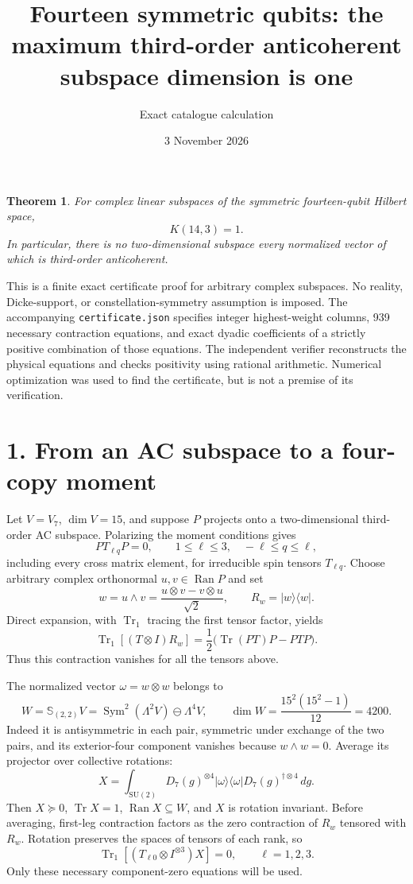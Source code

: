 \documentclass[11pt]{article}
\newtheorem{theorem}{Theorem}
\newcommand{\Tr}{\operatorname{Tr}}
\newcommand{\Sym}{\operatorname{Sym}}
\begin{document}
\title{Fourteen symmetric qubits: the maximum third-order anticoherent subspace dimension is one}
\author{Exact catalogue calculation}
\date{3 November 2026}
\maketitle
\begin{theorem}
For complex linear subspaces of the symmetric fourteen-qubit Hilbert space,
\[
 \boxed{K(14,3)=1.}
\]
In particular, there is no two-dimensional subspace every normalized vector of which is third-order anticoherent.
\end{theorem}
This is a finite exact certificate proof for arbitrary complex subspaces. No reality, Dicke-support, or constellation-symmetry assumption is imposed. The accompanying \texttt{certificate.json} specifies integer highest-weight columns, 939 necessary contraction equations, and exact dyadic coefficients of a strictly positive combination of those equations. The independent verifier reconstructs the physical equations and checks positivity using rational arithmetic. Numerical optimization was used to find the certificate, but is not a premise of its verification.

\section*{1. From an AC subspace to a four-copy moment}
Let $V=V_7$, $\dim V=15$, and suppose $P$ projects onto a two-dimensional third-order AC subspace. Polarizing the moment conditions gives
\[
 PT_{\ell q}P=0,\qquad 1\le\ell\le3,\quad -\ell\le q\le\ell,
\]
including every cross matrix element, for irreducible spin tensors $T_{\ell q}$.
Choose arbitrary complex orthonormal $u,v\in\operatorname{Ran}P$ and set
\[
 w=u\wedge v=\frac{u\otimes v-v\otimes u}{\sqrt2},
 \qquad R_w=|w\rangle\langle w|.
\]
Direct expansion, with $\Tr_1$ tracing the first tensor factor, yields
\[
 \Tr_1[(T\otimes I)R_w]
 =\frac12\bigl(\Tr(PT)P-PTP\bigr).
\]
Thus this contraction vanishes for all the tensors above.

The normalized vector $\omega=w\otimes w$ belongs to
\[
 W=\mathbb S_{(2,2)}V
 =\Sym^2(\Lambda^2V)\ominus\Lambda^4V,
 \qquad \dim W=\frac{15^2(15^2-1)}{12}=4200.
\]
Indeed it is antisymmetric in each pair, symmetric under exchange of the two pairs, and its exterior-four component vanishes because $w\wedge w=0$. Average its projector over collective rotations:
\[
 X=\int_{\mathrm{SU}(2)}D_7(g)^{\otimes4}
 |\omega\rangle\langle\omega|
 D_7(g)^{\dagger\otimes4}\,dg.
\]
Then $X\succeq0$, $\Tr X=1$, $\operatorname{Ran}X\subseteq W$, and $X$ is rotation invariant. Before averaging, first-leg contraction factors as the zero contraction of $R_w$ tensored with $R_w$. Rotation preserves the spaces of tensors of each rank, so
\begin{equation}\label{eq:contraction}
 \Tr_1[(T_{\ell0}\otimes I^{\otimes3})X]=0,
 \qquad\ell=1,2,3.
\end{equation}
Only these necessary component-zero equations will be used.
\end{document}
